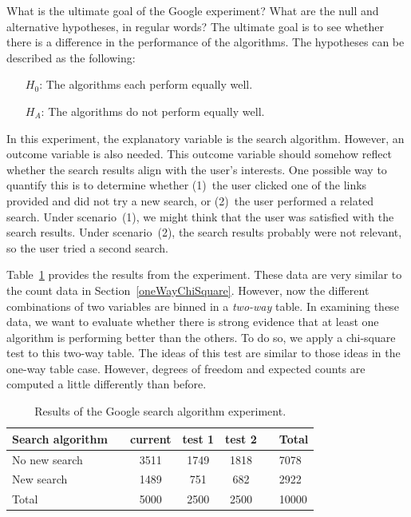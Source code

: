 \begin{example}{What is the ultimate goal of the Google experiment? What are the null and alternative hypotheses, in regular words?}
The ultimate goal is to see whether there is a difference in the performance of the algorithms. The hypotheses can be described as the following:
\begin{itemize}
\item[$H_0$:] The algorithms each perform equally well.
\item[$H_A$:] The algorithms do not perform equally well.
\end{itemize}
\end{example}

In this experiment, the explanatory variable is the search algorithm. However, an outcome variable is also needed. This outcome variable should somehow reflect whether the search results align with the user's interests. One possible way to quantify this is to determine whether (1)~the user clicked one of the links provided and did not try a new search, or (2)~the user performed a related search. Under scenario~(1), we might think that the user was satisfied with the search results. Under scenario~(2), the search results probably were not relevant, so the user tried a second search.

Table~\ref{googleSearchAlgorithmByAlgorithmAndPerformanceWithTotals} provides the results from the experiment. These data are very similar to the count data in Section~\ref{oneWayChiSquare}. However, now the different combinations of two variables are binned in a \emph{two-way} table. In examining these data, we want to evaluate whether there is strong evidence that at least one algorithm is performing better than the others. To do so, we apply a chi-square test to this two-way table. The ideas of this test are similar to those ideas in the one-way table case. However, degrees of freedom and expected counts are computed a little differently than before.

\begin{table}[h]
\centering
\begin{tabular}{ll ccc ll}
\hline
Search algorithm & \hspace{1mm} & current & test 1 & test 2 & \hspace{1mm} & Total \\
\hline
No new search				   & & 3511    & 1749 & 1818 & 				& 7078 \\
New search				   & & 1489    & 751	& 682    &				& 2922 \\
\hline
Total						   & & 5000    & 2500 & 2500 & 				& 10000 \\
\hline
\end{tabular}
\caption{Results of the Google search algorithm experiment.}
\label{googleSearchAlgorithmByAlgorithmAndPerformanceWithTotals}
\end{table}

